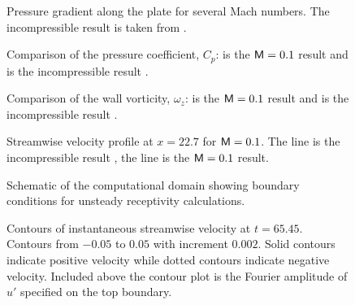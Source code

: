 %
%
\begin{figure}[p]
\centering
{}
\epsfxsize=5.0in 
\caption {Pressure gradient along the plate for several Mach numbers.  The
incompressible result is taken from \protect\cite{Lin:92}.
\label{dpds} }
\end{figure}
%
\begin{figure}[p]
\centering
{}
\epsfxsize=5.0in 
\caption [Comparison of the pressure coefficient]{Comparison of the pressure
coefficient, $C_p$: \solid is the $\M=0.1$ result and \dashed is the
incompressible result \protect\cite{Lin:92}.
\label{f:cp} }
\end{figure}
%
\begin{figure}[p]
\centering
{}
\epsfxsize=5.0in 
\caption [Comparison of the wall vorticity] {Comparison of the wall vorticity,
$\omega_z$: \solid is the $\M=0.1$ result and \dashed is the incompressible
result \protect\cite{Lin:92}.
\label{f:omega} }
\end{figure}
%
\begin{figure}[p]
\centering
{} 
\epsfxsize=3.0in 
\caption [Streamwise velocity profile at $x=22.7$ for $\M=0.1$]{Streamwise
velocity profile at $x=22.7$ for $\M=0.1$. The \solid line is the
incompressible result \protect\cite{Lin:92}, the \ldashed line is the $\M=0.1$
result. \label{profile} }
\end{figure}
%
%
\begin{figure}[p]
\centering
\epsfxsize=5.0in 
\caption [Schematic of the computational domain]{Schematic of the
computational domain showing boundary conditions for unsteady receptivity
calculations. \label{schematic} }
\end{figure}
%
\begin{figure}[p]
\centering
\epsfxsize=5.0in 
\caption [Contours of instantaneous streamwise velocity at
$t=65.45$.]{Contours of instantaneous streamwise velocity at $t=65.45$.
Contours from $-0.05$ to $0.05$ with increment $0.002$.  Solid contours
indicate positive velocity while dotted contours indicate negative velocity.
Included above the contour plot is the Fourier amplitude of $u'$ specified on
the top boundary. \label{uprime} }
\end{figure}
